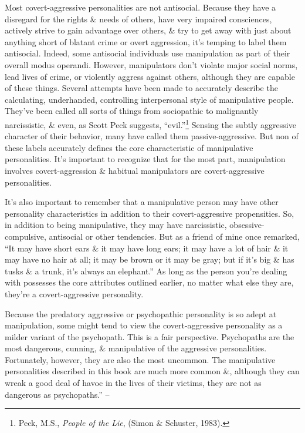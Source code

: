 \documentclass{article}
\numberwithin{equation}{section}
\begin{document}
Most covert-aggressive personalities are not antisocial. Because they have a disregard for the rights \& needs of others, have very impaired consciences, actively strive to gain advantage over others, \& try to get away with just about anything short of blatant crime or overt aggression, it's temping to label them antisocial. Indeed, some antisocial individuals use manipulation as part of their overall modus operandi. However, manipulators don't violate major social norms, lead lives of crime, or violently aggress against others, although they are capable of these things. Several attempts have been made to accurately describe the calculating, underhanded, controlling interpersonal style of manipulative people. They've been called all sorts of things from sociopathic to malignantly narcissistic, \& even, as Scott Peck suggests, ``evil.''\footnote{Peck, M.S., \textit{People of the Lie}, (Simon \& Schuster, 1983).} Sensing the subtly aggressive character of their behavior, many have called them passive-aggressive. But non of these labels accurately defines the core characteristic of manipulative personalities. It's important to recognize that for the most part, manipulation involves covert-aggression \& habitual manipulators are covert-aggressive personalities.

It's also important to remember that a manipulative person may have other personality characteristics in addition to their covert-aggressive propensities. So, in addition to being manipulative, they may have narcissistic, obsessive-compulsive, antisocial or other tendencies. But as a friend of mine once remarked, ``It may have short ears \& it may have long ears; it may have a lot of hair \& it may have no hair at all; it may be brown or it may be gray; but if it's big \& has tusks \& a trunk, it's always an elephant.'' As long as the person you're dealing with possesses the core attributes outlined earlier, no matter what else they are, they're a covert-aggressive personality.

Because the predatory aggressive or psychopathic personality is so adept at manipulation, some might tend to view the covert-aggressive personality as a milder variant of the psychopath. This is a fair perspective. Psychopaths are the most dangerous, cunning, \& manipulative of the aggressive personalities. Fortunately, however, they are also the most uncommon. The manipulative personalities described in this book are much more common \&, although they can wreak a good deal of havoc in the lives of their victims, they are not as dangerous as psychopaths.'' -- \cite[pp. 41--44]{Simon2010}
\end{document}
